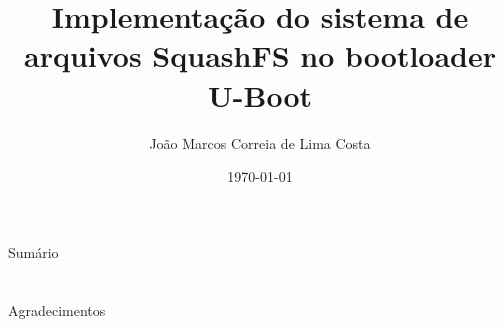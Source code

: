 \documentclass[handout]{beamer}
\title[Trabalho de conclusão de curso]{
	Implementação do sistema de arquivos SquashFS no bootloader U-Boot}
\date{
	\today}
\author[João Marcos Correia de Lima Costa]{
	João Marcos Correia de Lima Costa %
	}
\institute[INSTITUTO]{
	\vspace{0.25cm}
	Departamento de Engenharia Elétrica\\
	Universidade Federal do Rio Grande do Norte}
\begin{document}
\frame{\titlepage}
\begin{frame}{Sumário}
	\tableofcontents
\end{frame}









%

\section{}
\begin{frame}{}
	\begin{center}
	Agradecimentos    
	\end{center}
	
\end{frame}
\end{document}
